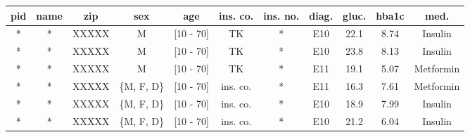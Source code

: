 \begin{table}[ht]
    \begin{center}
        \footnotesize{
            \renewcommand{\arraystretch}{1.5}
            \begin{adjustbox}{center}
                \begin{tabular}{ | c | c | c | c | c | c | c | c | c | c | c | } 
                    \hline
                    \cellcolor{lightred} pid & \cellcolor{lightred} name & \cellcolor{lightyellow} zip & \cellcolor{lightyellow} sex & \cellcolor{lightyellow} age & \cellcolor{lightyellow} ins. co. & \cellcolor{lightred} ins. no. & diag. & gluc. & hba1c & med. \\
                    \hline
                    \cellcolor{lightred} * & \cellcolor{lightred} * & \cellcolor{lightyellow} XXXXX & M & \cellcolor{lightyellow} {[10 - 70]} & TK & \cellcolor{lightred} * & E10 & 22.1 & 8.74 & Insulin \\
                    \hline
                    \cellcolor{lightred} * & \cellcolor{lightred} * & \cellcolor{lightyellow} XXXXX & M & \cellcolor{lightyellow} {[10 - 70]} & TK & \cellcolor{lightred} * & E10 & 23.8 & 8.13 & Insulin \\
                    \hline 
                    \cellcolor{lightred} * & \cellcolor{lightred} * & \cellcolor{lightyellow} XXXXX & M & \cellcolor{lightyellow} {[10 - 70]} & TK & \cellcolor{lightred} * & E11 & 19.1 & 5.07 & Metformin \\
                    \hline
                    \cellcolor{lightred} * & \cellcolor{lightred} * & \cellcolor{lightyellow} XXXXX & \cellcolor{lightyellow} \{M, F, D\} & \cellcolor{lightyellow} {[10 - 70]} & \cellcolor{lightyellow} ins. co. & \cellcolor{lightred} * & E11 & 16.3 & 7.61 & Metformin \\
                    \hline
                    \cellcolor{lightred} * & \cellcolor{lightred} * & \cellcolor{lightyellow} XXXXX & \cellcolor{lightyellow} \{M, F, D\} & \cellcolor{lightyellow} {[10 - 70]} & \cellcolor{lightyellow} ins. co. & \cellcolor{lightred} * & E10 & 18.9 & 7.99 & Insulin \\
                    \hline
                    \cellcolor{lightred} * & \cellcolor{lightred} * & \cellcolor{lightyellow} XXXXX & \cellcolor{lightyellow} \{M, F, D\} & \cellcolor{lightyellow} {[10 - 70]} & \cellcolor{lightyellow} ins. co. & \cellcolor{lightred} * & E10 & 21.2 & 6.04 & Insulin \\
                    \hline
                \end{tabular}

\end{adjustbox}}
\end{center}
\end{table}
